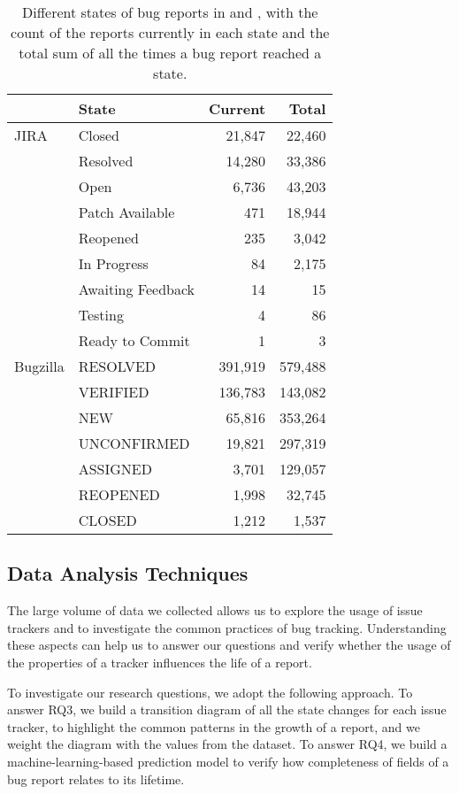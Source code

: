 \begin{table}[ht]
\centering
\caption{Different states of bug reports in \bzilla and \jira, with the count of the reports currently in each state and the total sum of all the times a bug report reached a state.}
\begin{tabular}{l|l|rr}
\rowcolor{tableheader}{\bfseries Tracker} & {\bfseries State} & {\bfseries Current} & {\bfseries Total} \\ \hline
JIRA & Closed & 21,847 & 22,460 \\
& Resolved & 14,280 & 33,386  \\
&  Open & 6,736 & 43,203 \\
&  Patch Available & 471 & 18,944 \\
&  Reopened & 235 & 3,042 \\
&  In Progress & 84 & 2,175 \\
&  Awaiting Feedback & 14 & 15 \\
&  Testing & 4 & 86 \\
&  Ready to Commit & 1 & 3 \\ \hline
Bugzilla & RESOLVED & 391,919 & 579,488 \\
&  VERIFIED & 136,783 & 143,082\\
&  NEW & 65,816 & 353,264\\
&  UNCONFIRMED & 19,821 & 297,319 \\
&  ASSIGNED & 3,701 & 129,057 \\
&  REOPENED & 1,998 & 32,745 \\
&  CLOSED & 1,212 & 1,537 \\ \hline
\end{tabular}
\label{tab:dataset-statuses}
\end{table}

\subsection{Data Analysis Techniques}

The large volume of data we collected allows us to explore the usage of issue trackers and to investigate the common practices of bug tracking.
Understanding these aspects can help us to answer our questions and verify whether the usage of the properties of a tracker influences the life of a  report.

To investigate our research questions, we adopt the following approach.
To answer RQ3, we build a transition diagram of all the state changes for each issue tracker, to highlight the common patterns in the growth of a report, and we weight the diagram with the values from the dataset.
To answer RQ4, we build a machine-learning-based prediction model to verify how completeness of fields of a bug report relates to its lifetime.


